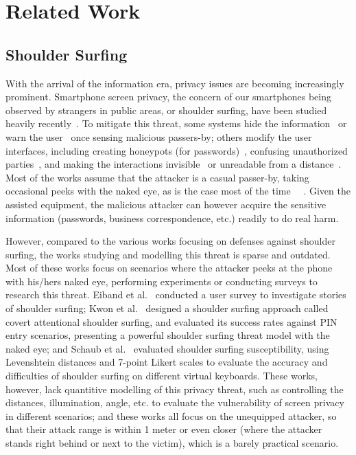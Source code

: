 \section{Related Work}
\label{sec-related-work}

\subsection{Shoulder Surfing}
With the arrival of the information era, privacy issues are becoming increasingly prominent. Smartphone screen privacy, the concern of our smartphones being observed by strangers in public areas, or shoulder surfing, have been studied heavily recently~\cite{eiband2017understanding,goucher2011look,kwon2013covert}. To mitigate this threat, some systems hide the information~\cite{brudy2014anyone} or warn the user~\cite{saad2018communicating} once sensing malicious passers-by; others modify the user interfaces, including creating honeypots (for passwords)~\cite{chakraborty2014tag}, confusing unauthorized parties~\cite{wiedenbeck2006design}, and making the interactions invisible~\cite{kumar2007reducing} or unreadable from a distance~\cite{Chun2019Keep}. Most of the works assume that the attacker is a casual passer-by, taking occasional peeks with the naked eye, as is the case most of the time~\cite{eiband2017understanding} ~\cite{wiedenbeck2006design}. Given the assisted equipment, the malicious attacker can however acquire the sensitive information (passwords, business correspondence, etc.) readily to do real harm.

However, compared to the various works focusing on defenses against shoulder surfing, the works studying and modelling this threat is sparse and outdated. Most of these works focus on scenarios where the attacker peeks at the phone with his/hers naked eye, performing experiments or conducting surveys to research this threat. Eiband et al.~\cite{eiband2017understanding} conducted a user survey to investigate stories of shoulder surfing; Kwon et al.~\cite{kwon2013covert} designed a shoulder surfing approach called covert attentional shoulder surfing, and evaluated its success rates against PIN entry scenarios, presenting a powerful shoulder surfing threat model with the naked eye; and Schaub et al.~\cite{schaub2012password} evaluated shoulder surfing susceptibility, using Levenshtein distances and 7-point Likert scales to evaluate the accuracy and difficulties of shoulder surfing on different virtual keyboards. These works, however, lack quantitive modelling of this privacy threat, such as controlling the distances, illumination, angle, etc. to evaluate the vulnerability of screen privacy in different scenarios; and these works all focus on the unequipped attacker, so that their attack range is within 1 meter or even closer (where the attacker stands right behind or next to the victim), which is a barely practical scenario.

